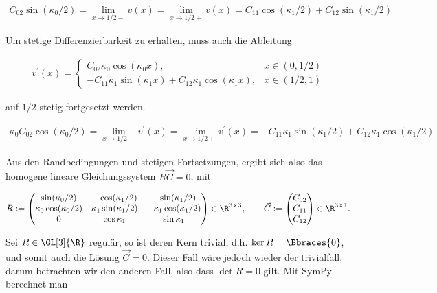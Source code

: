 \begin{align*}
  C_{02} \sin(\kappa_0/2)
  = \lim_{x \to 1/2-} v(x)
  = \lim_{x \to 1/2+} v(x)
  = C_{11} \cos(\kappa_1/2) + C_{12} \sin(\kappa_1/2)
\end{align*}

Um stetige Differenzierbarkeit zu erhalten, muss auch die Ableitung

\begin{align*}
  v^\prime(x) =
  \begin{cases}
    C_{02} \kappa_0 \cos(\kappa_0 x),
    & x \in (0, 1/2) \\
    - C_{11} \kappa_1 \sin(\kappa_1 x) + C_{12} \kappa_1 \cos(\kappa_1 x),
    & x \in (1/2, 1)
  \end{cases}
\end{align*}

auf $1/2$ stetig fortgesetzt werden.

\begin{align*}
  \kappa_0 C_{02} \cos(\kappa_0/2)
  = \lim_{x \to 1/2-} v^\prime(x)
  = \lim_{x \to 1/2+} v^\prime(x)
  = - C_{11} \kappa_1 \sin(\kappa_1/2) + C_{12} \kappa_1 \cos(\kappa_1/2)
\end{align*}

Aus den Randbedingungen und stetigen Fortsetzungen, ergibt sich also das homogene lineare Gleichungssystem $R \vec C = 0$, mit

\begin{align*}
  R :=
  \begin{pmatrix}
    \sin(\kappa_0/2)          & -\cos(\kappa_1/2)         & -\sin(\kappa_1/2) \\
    \kappa_0 \cos(\kappa_0/2) & \kappa_1 \sin(\kappa_1/2) & - \kappa_1 \cos(\kappa_1/2) \\
    0                         & \cos{\kappa_1}            & \sin{\kappa_1}
  \end{pmatrix}
  \in \R^{3 \times 3}, \qquad
  \vec C :=
  \begin{pmatrix}
    C_{02} \\
    C_{11} \\
    C_{12}
  \end{pmatrix}
  \in \R^{3 \times 1}.
\end{align*}

Sei $R \in \GL[3]{\R}$ regulär, so ist deren Kern trivial, d.h. $\ker{R} = \Bbraces{0}$, und somit auch die Lösung $\vec C = 0$. Dieser Fall wäre jedoch wieder der trivialfall, darum betrachten wir den anderen Fall, also dass $\det{R} = 0$ gilt. Mit SymPy berechnet man

